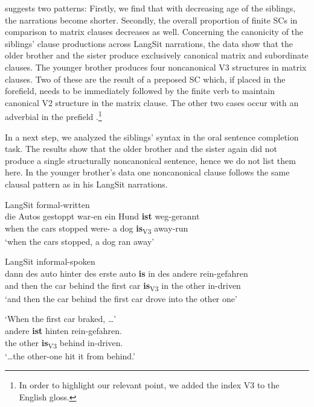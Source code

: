 \documentclass[output=paper]{langscibook}
\begin{document}
 suggests two patterns: Firstly, we find that with decreasing age of the siblings, the narrations become shorter. Secondly, the overall proportion of finite SCs in comparison to matrix clauses decreases as well. Concerning the canonicity of the siblings’ clause productions across LangSit narrations, the data show that the older brother and the sister produce exclusively canonical matrix and subordinate clauses. The younger brother produces four noncanonical V3 structures in matrix clauses. Two of these are the result of a preposed SC  which, if placed in the forefield, needs to be immediately followed by the finite verb to maintain canonical V2 structure in the matrix clause. The other two cases occur with an adverbial in the prefield .\footnote{In order to highlight our relevant point, we added the index V3 to the English gloss.}

In a next step, we analyzed the siblings’ syntax in the oral sentence completion task. The results show that the older brother and the sister again did not produce a single structurally noncanonical sentence, hence we do not list them here. In the younger brother’s data one noncanonical clause  follows the same clausal pattern as in his LangSit narrations.

\ea%
    \label{ex:tsehaye:9}
\ea LangSit formal-written\label{ex:tsehaye:9a}\\
 {die} {Autos} {gestoppt} {war-en} {ein} {Hund} \textbf{{ist}} {weg-gerannt}\\
when the cars stopped were-\Tpl{} a dog \textbf{is}\textsubscript{V3} away-run\\
\glt ‘when the cars stopped, a dog ran away’

\ex LangSit informal-spoken\label{ex:tsehaye:9b}\\
 {dann} {des} {auto} {hinter} {des} {erste} {auto} \textbf{{is}} {in} {des} {andere} {rein-gefahren}\\
and then the car behind the first car \textbf{is}\textsubscript{V3} in the other in-driven\\
\glt ‘and then the car behind the first car drove into the other one’

 ‘When the first car braked, …’\label{ex:tsehaye:9c}\\
 {andere} \textbf{{ist}} {hinten} {rein-gefahren.}\\
the other \textbf{is}\textsubscript{V3} behind in-driven.\\
\glt ‘…the other-one hit it from behind.’
\z
\z
\end{document}
